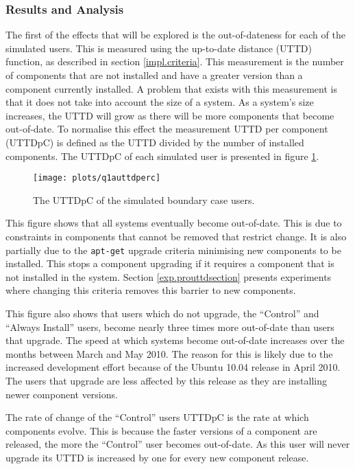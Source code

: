 \subsubsection{Results and Analysis}
The first of the effects that will be explored is the out-of-dateness for each of the simulated users.
This is measured using the up-to-date distance (UTTD) function, as described in section \ref{impl.criteria}.
This measurement is the number of components that are not installed and have a greater version than a component currently installed.
A problem that exists with this measurement is that it does not take into account the size of a system.
As a system's size increases, the UTTD will grow as there will be more components that become out-of-date.
To normalise this effect the measurement UTTD per component (UTTDpC) is defined as the UTTD divided by the number of installed components.
The UTTDpC of each simulated user is presented in figure \ref{exp.q1auttdpc}.
\begin{figure}[htp]
\begin{center}
  \texttt{[image: plots/q1auttdperc]}
  \caption{The UTTDpC of the simulated boundary case users.}
  \label{exp.q1auttdpc}
\end{center}
\end{figure}

This figure shows that all systems eventually become out-of-date.
This is due to constraints in components that cannot be removed that restrict change. 
It is also partially due to the \texttt{apt-get} upgrade criteria minimising new components to be installed.
This stops a component upgrading if it requires a component that is not installed in the system.
Section \ref{exp.prouttdsection} presents experiments where changing this criteria removes this barrier to new components. 

This figure also shows that users which do not upgrade, the ``Control'' and ``Always Install'' users, become nearly three times more out-of-date than users that upgrade.
The speed at which systems become out-of-date increases over the months between March and May 2010.
The reason for this is likely due to the increased development effort because of the Ubuntu 10.04 release in April 2010.
The users that upgrade are less affected by this release as they are installing newer component versions.

The rate of change of the ``Control'' users UTTDpC is the rate at which components evolve.
This is because the faster versions of a component are released, the more the ``Control'' user becomes out-of-date.
As this user will never upgrade its UTTD is increased by one for every new component release.

